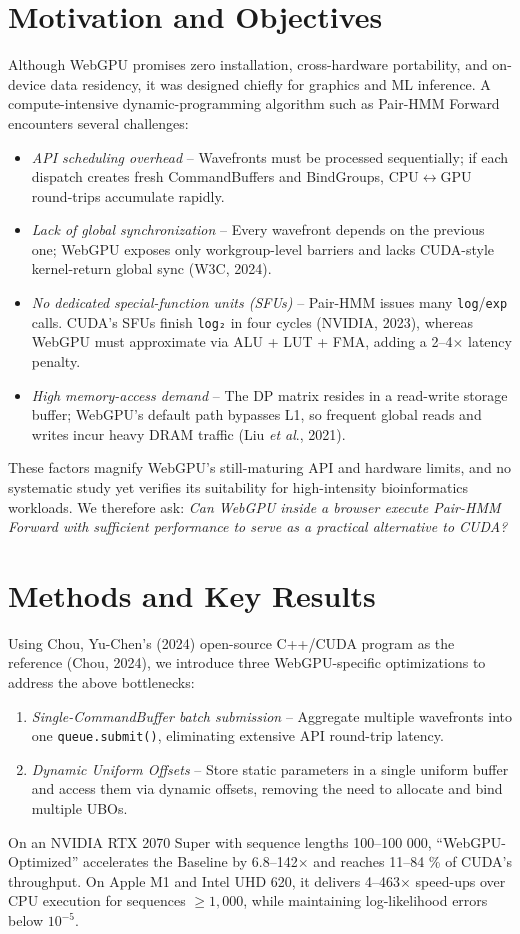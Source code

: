 \documentclass[PhD]{PHlab-thesis}
\begin{document}
\section{Motivation and Objectives}
Although WebGPU promises zero installation, cross-hardware portability, and on-device data residency, it was designed chiefly for graphics and ML inference. A compute-intensive dynamic-programming algorithm such as Pair-HMM Forward encounters several challenges:
\begin{itemize}
    \item \emph{API scheduling overhead} – Wavefronts must be processed sequentially; if each dispatch creates fresh CommandBuffers and BindGroups, CPU$\leftrightarrow$GPU round-trips accumulate rapidly.
    \item \emph{Lack of global synchronization} – Every wavefront depends on the previous one; WebGPU exposes only workgroup-level barriers and lacks CUDA-style kernel-return global sync (W3C, 2024).
    \item \emph{No dedicated special-function units (SFUs)} – Pair-HMM issues many \texttt{log}/\texttt{exp} calls. CUDA's SFUs finish \texttt{log₂} in four cycles (NVIDIA, 2023), whereas WebGPU must approximate via ALU + LUT + FMA, adding a 2–4$\times$ latency penalty.
    \item \emph{High memory-access demand} – The DP matrix resides in a read-write storage buffer; WebGPU's default path bypasses L1, so frequent global reads and writes incur heavy DRAM traffic (Liu \emph{et al}., 2021).
\end{itemize}
These factors magnify WebGPU's still-maturing API and hardware limits, and no systematic study yet verifies its suitability for high-intensity bioinformatics workloads. We therefore ask: \emph{Can WebGPU inside a browser execute Pair-HMM Forward with sufficient performance to serve as a practical alternative to CUDA?}

\section{Methods and Key Results}
Using Chou, Yu-Chen's (2024) open-source C++/CUDA program as the reference (Chou, 2024), we introduce three WebGPU-specific optimizations to address the above bottlenecks:
\begin{enumerate}
    \item \emph{Single-CommandBuffer batch submission} – Aggregate multiple wavefronts into one \texttt{queue.submit()}, eliminating extensive API round-trip latency.
    \item \emph{Dynamic Uniform Offsets} – Store static parameters in a single uniform buffer and access them via dynamic offsets, removing the need to allocate and bind multiple UBOs.
\end{enumerate}
On an NVIDIA RTX 2070 Super with sequence lengths 100–100 000, “WebGPU-Optimized” accelerates the Baseline by 6.8–142$\times$ and reaches 11–84 \% of CUDA's throughput. On Apple M1 and Intel UHD 620, it delivers 4–463$\times$ speed-ups over CPU execution for sequences \(\ge 1{,}000\), while maintaining log-likelihood errors below \(10^{-5}\).
\end{document}
